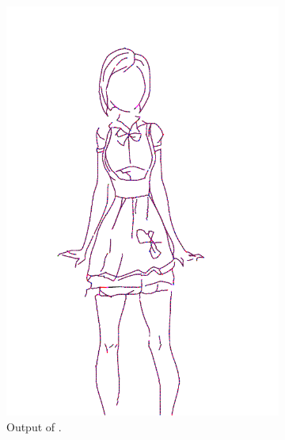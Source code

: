 \begin{figure}[h]
\begin{subfigure}{.3\textwidth}
    \includegraphics[width=\textwidth]{graphics/outputs/polyvector-flow/order/sketchbench-black_Art_freeform_AG_03_Branislav Mirkovic_norm_cleaned.pdf}
    \caption{Output of \citet{Puhachov2021KeypointPolyvector}.}
    \end{subfigure}
    \begin{subfigure}{.3\textwidth}

\end{subfigure}
\end{figure}
